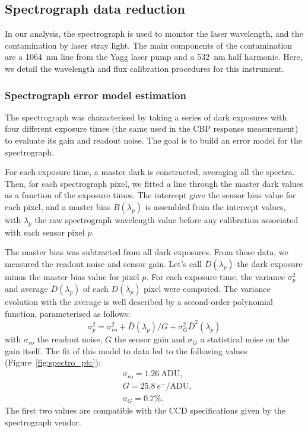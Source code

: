 \subsection{Spectrograph data reduction}
\label{sec:spectro_reduction}

In our analysis, the spectrograph is used to monitor the laser wavelength, and the contamination by laser stray light. The main components of the contamination are a \SI{1064}{\nm} line from the Yagg laser pump and a \SI{532}{\nm} half harmonic. Here, we detail the wavelength and flux calibration procedures for this instrument.


\subsubsection{Spectrograph error model estimation}

The spectrograph was characterised by taking a series of dark exposures with four different exposure times (the same used in the CBP response measurement) to evaluate its gain and readout noise. The goal is to build an error model for the spectrograph.

For each exposure time, a master dark is constructed, averaging all the spectra. Then, for each spectrograph pixel, we fitted a line through the master dark values as a function of the exposure times. The intercept gave the sensor bias value for each pixel, and a master bias $B(\lambda_p)$ is assembled from the intercept values, with $\lambda_p$ the raw spectrograph wavelength value before any calibration associated with each sensor pixel $p$. 

The master bias was subtracted from all dark exposures. From those data, we measured the readout noise and sensor gain. Let's call $D(\lambda_p)$ the dark exposure minus the master bias value for pixel $p$. For each exposure time, the variance $\sigma_p^2$ and average $\bar{D}(\lambda_p)$ of each $D(\lambda_p)$ pixel were computed. The variance evolution with the average is well described by a second-order polynomial function, parameterised as follows:
\begin{equation}\label{eq:spectro_error_model}
\sigma^2_p =\sigma_{ro}^2 +  \bar{D}(\lambda_p)/G + \sigma_G^2 \bar{D}^2(\lambda_p)
\end{equation}
with $\sigma_{ro}$ the readout noise, $G$ the sensor gain and $\sigma_G$ a statistical noise on the gain itself. The fit of this model to data led to the following values (Figure~\ref{fig:spectro_ptc}):
\begin{align}
    & \sigma_{ro} = 1.26\ \mathrm{ADU}, \\
    & G = 25.8\ e^-/\mathrm{ADU} ,\\
    & \sigma_G = 0.7\%.
\end{align}
The first two values are compatible with the CCD specifications given by the spectrograph vendor. 

